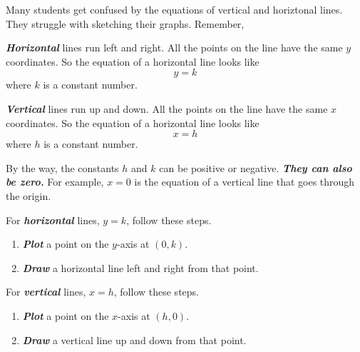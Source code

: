 \documentclass[fleqn,letterpaper,12pt,printwatermark=false]{memoir}
\begin{document}
\begin{myLesson}[][3]
    Many students get confused by the equations of vertical and horiztonal lines.
    They struggle with sketching their graphs.
    Remember,
    \begin{myLessonBox}
        {\bfseries\itshape Horizontal} lines run left and right.
        All the points on the line have the same $y$ coordinates.
        So the equation of a horizontal line looks like
        \[ y = k \]
        where $k$ is a constant number.
    \end{myLessonBox}
    \begin{myLessonBox}
        {\bfseries\itshape Vertical} lines run up and down.
        All the points on the line have the same $x$ coordinates.
        So the equation of a horizontal line looks like
        \[ x = h \]
        where $h$ is a constant number.
    \end{myLessonBox}
\end{myLesson}

By the way, the constants $h$ and $k$ can be positive or negative.
{\bfseries\itshape They can also be zero.}
For example, $x=0$ is the equation of a vertical line that goes through the origin.

\begin{myKeyConcepts}
    For {\bfseries\itshape horizontal} lines, $y=k$, follow these steps.
    \begin{enumerate}
        \item {\bfseries\itshape Plot} a point on the $y$-axis at $(0,k)$.
        \item {\bfseries\itshape Draw} a horizontal line left and right from that point.
    \end{enumerate}
    \vspace{1em}
    For {\bfseries\itshape vertical} lines, $x=h$, follow these steps.
    \begin{enumerate}
        \item {\bfseries\itshape Plot} a point on the $x$-axis at $(h,0)$.
        \item {\bfseries\itshape Draw} a vertical line up and down from that point.
    \end{enumerate}
\end{myKeyConcepts}





  
\end{document}
